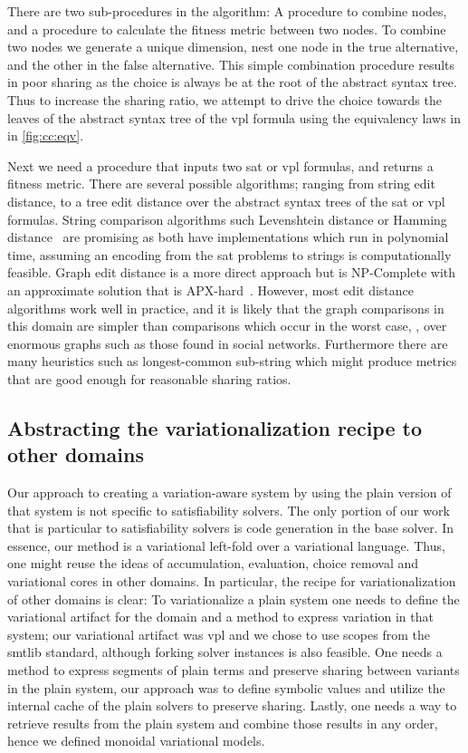 There are two sub-procedures in the algorithm: A procedure to combine nodes, and
a procedure to calculate the fitness metric between two nodes. To combine two
nodes we generate a unique dimension, nest one node in the true alternative, and
the other in the false alternative. This simple combination procedure results in
poor sharing as the choice is always be at the root of the abstract syntax tree.
Thus to increase the sharing ratio, we attempt to drive the choice towards the
leaves of the abstract syntax tree of the \ac{vpl} formula using the equivalency
laws in in \autoref{fig:cc:eqv}.

Next we need a procedure that inputs two \ac{sat} or \ac{vpl} formulas, and
returns a fitness metric. There are several possible algorithms; ranging from
string edit distance, to a tree edit distance over the abstract syntax trees of
the \ac{sat} or \ac{vpl} formulas. String comparison algorithms such Levenshtein
distance\cite{Levenshtein_SPD66} or Hamming distance~\cite{H:BST50} are
promising as both have implementations which run in polynomial time, assuming an
encoding from the \ac{sat} problems to strings is computationally feasible.
Graph edit distance is a more direct approach but is NP-Complete with an
approximate solution that is APX-hard~\cite{hardnessOfGraphEditDistance}.
However, most edit distance algorithms work well in practice, and it is likely
that the graph comparisons in this domain are simpler than comparisons which
occur in the worst case, \eg{}, over enormous graphs such as those found in
social networks. Furthermore there are many heuristics such as longest-common
sub-string which might produce metrics that are good enough for reasonable
sharing ratios.

\subsection{Abstracting the variationalization recipe to other domains}
Our approach to creating a variation-aware system by using the plain version of
that system is not specific to satisfiability solvers. The only portion of our
work that is particular to satisfiability solvers is code generation in the base
solver. In essence, our method is a variational left-fold over a variational
language. Thus, one might reuse the ideas of accumulation, evaluation, choice
removal and variational cores in other domains. In particular, the recipe for
variationalization of other domains is clear: To variationalize a plain system
one needs to define the variational artifact for the domain and a method to
express variation in that system; our variational artifact was \ac{vpl} and we
chose to use scopes from the \acl{smtlib} standard, although forking solver
instances is also feasible. One needs a method to express segments of plain
terms and preserve sharing between variants in the plain system, our approach
was to define symbolic values and utilize the internal cache of the plain
solvers to preserve sharing. Lastly, one needs a way to retrieve results from
the plain system and combine those results in any order, hence we defined
monoidal variational models.

